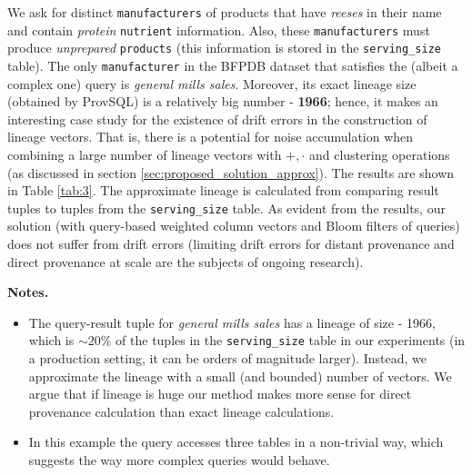 \begin{example-withrun}\label{experiment:3}
% 
We ask for distinct \texttt{manufacturers} of products that have \textit{reeses} in their name and contain \textit{protein}
                         \texttt{nutrient} information.
                Also, these \texttt{manufacturers} must produce \textit{unprepared} \texttt{products} (this information is stored in the \texttt{serving\_size} table).
The only \texttt{manufacturer} in the BFPDB dataset that satisfies the (albeit a complex one) query is \textit{general mills sales}. Moreover, its exact lineage size (obtained by ProvSQL) is a relatively big number - \textbf{1966}; hence, it makes an interesting case study for the existence of drift errors in the construction of lineage vectors. That is, there is a potential for noise accumulation when combining a large number of lineage vectors with $+,\cdot$ and clustering operations (as discussed in section \ref{sec:proposed_solution_approx}). 
The results are shown in Table \ref{tab:3}. The approximate lineage is calculated from comparing result tuples to tuples from the \texttt{serving\_size} table. As evident from the results, our solution (with query-based weighted column vectors and Bloom filters of queries) does not suffer from drift errors (limiting drift errors for distant provenance and direct provenance at scale are the subjects of ongoing research).
\par\textbf{Notes.} 
\begin{itemize}
    \item The query-result tuple for \textit{general mills sales} has a lineage of size - 1966, which is ${\sim}20\%$ of the tuples in the \texttt{serving\_size} table in our experiments (in a production setting, it can be orders of magnitude larger). Instead, we approximate the lineage with a small (and bounded) number of vectors. We argue that if lineage is huge our method makes more sense for direct provenance calculation than exact lineage calculations.
    \item In this example the query accesses three tables in a non-trivial way, which suggests the way more complex queries would behave.
\end{itemize}

\end{example-withrun}


